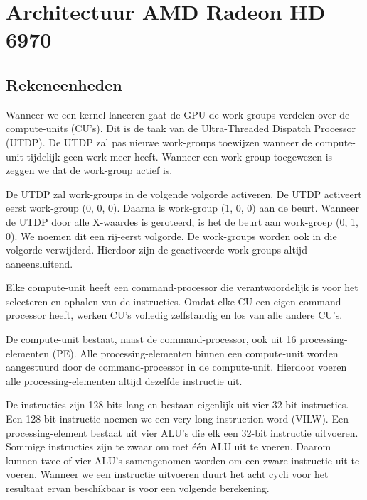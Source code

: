 
\section{Architectuur AMD Radeon HD 6970}
\subsection{Rekeneenheden}

Wanneer we een kernel lanceren gaat de GPU de work-groups verdelen over de compute-units  (CU's). Dit is de taak van de Ultra-Threaded Dispatch Processor (UTDP). De UTDP zal pas nieuwe work-groups toewijzen wanneer de compute-unit tijdelijk geen werk meer heeft.  Wanneer een work-group toegewezen is zeggen we dat de work-group actief is. 

\label{WGvolg}
De UTDP zal work-groups in de volgende volgorde activeren. De UTDP activeert eerst work-group (0, 0, 0). Daarna is work-group (1, 0, 0) aan de beurt. Wanneer de UTDP door alle X-waardes is geroteerd, is het de beurt aan work-groep (0, 1, 0). We noemen dit een rij-eerst volgorde. De work-groups worden ook in die volgorde verwijderd. Hierdoor zijn de geactiveerde work-groups altijd aaneensluitend.\cite[p.~6-8]{amd}

Elke compute-unit heeft een command-processor die verantwoordelijk is voor het selecteren en ophalen van de instructies. Omdat elke CU een eigen command-processor heeft, werken CU's volledig zelfstandig en los van alle andere CU's.

De compute-unit bestaat, naast de command-processor, ook uit 16 processing-elementen (PE). Alle processing-elementen binnen een compute-unit worden aangestuurd door de command-processor in de compute-unit. Hierdoor voeren alle processing-elementen altijd dezelfde instructie uit.

De instructies zijn 128 bits lang en bestaan eigenlijk uit vier 32-bit instructies. Een 128-bit instructie noemen we een very long instruction word (VILW). Een processing-element bestaat uit vier ALU's die elk een 32-bit instructie uitvoeren. Sommige instructies zijn te zwaar om met \'e\'en ALU uit te voeren. Daarom kunnen twee of vier ALU's samengenomen worden om een zware instructie uit te voeren. Wanneer we een instructie uitvoeren duurt het acht cycli voor het resultaat ervan beschikbaar is voor een volgende berekening.

